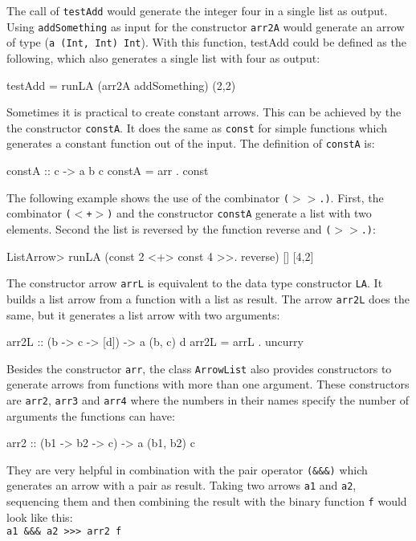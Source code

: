 \documentclass[11pt,a4paper,headsepline, bibtotoc]{scrreprt}
\begin{document}
The call of \texttt{testAdd} would generate the integer four in a single list as output. Using \texttt{addSomething} as input for the constructor \texttt{arr2A} would generate an arrow of type (\texttt{a (Int, Int) Int}). With this function, testAdd could be defined as the following, which also generates a single list with four as output:
\begin{code}[caption=arr2A Example]
testAdd = runLA (arr2A addSomething) (2,2) 
\end{code}
Sometimes it is practical to create constant arrows. This can be achieved by the the constructor \texttt{constA}. It does the same as \texttt{const} for simple functions which generates a constant function out of the input. The definition of \texttt{constA} is: 
\begin{code}
constA :: c -> a b c
constA = arr . const
\end{code}
The following example shows the use of the combinator \texttt{($>$$>$.)}. First, the combinator \texttt{($<$+$>$)} and the constructor \texttt{constA} generate a list with two elements. Second the list is reversed by the function reverse and \texttt{($>$$>$.)}:
\begin{code}[caption=($>$$>$.) Example]
ListArrow> runLA (const 2 <+> const 4 >>. reverse) []
[4,2]
\end{code}
The constructor arrow \texttt{arrL} is equivalent to the data type constructor \texttt{LA}. It builds a list arrow from a function with a list as result. The arrow \texttt{arr2L} does the same, but it generates a list arrow with two arguments:
\begin{code}
arr2L :: (b -> c -> [d]) -> a (b, c) d
arr2L = arrL . uncurry
\end{code}
Besides the constructor \texttt{arr}, the class \texttt{ArrowList} also provides constructors to generate arrows from functions with more than one argument. These constructors are \texttt{arr2}, \texttt{arr3} and \texttt{arr4} where the numbers in their names specify the number of arguments the functions can have:
\begin{code}
arr2 :: (b1 -> b2 -> c) -> a (b1, b2) c
\end{code}
They are very helpful in combination with the pair operator \texttt{(\&\&\&)} which generates an arrow with a pair as result. Taking two arrows \texttt{a1} and \texttt{a2}, sequencing them and then combining the result with the binary function \texttt{f} would look like this: \\
\texttt{a1 \&\&\& a2 >>> arr2 f}\\
\end{document}
